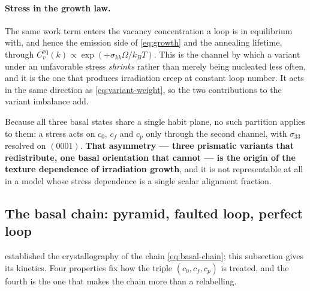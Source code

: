 \documentclass{article}
\begin{document}
\paragraph{Stress in the growth law.} The same work term enters the vacancy
concentration a loop is in equilibrium with, and hence the emission side of
\cref{eq:growth} and the annealing lifetime, through
$C_v^{\mathrm{eq}}(k)\propto\exp(+\sigma_{kk}\Omega/k_BT)$. This is the
channel by which a variant under an unfavorable stress \emph{shrinks} rather
than merely being nucleated less often, and it is the one that produces
irradiation creep at constant loop number. It acts in the same direction as
\cref{eq:variant-weight}, so the two contributions to the variant imbalance add.

Because all three basal states share a single habit plane, no such partition
applies to them: a stress acts on $c_0$, $c_f$ and $c_p$ only through the second
channel, with $\sigma_{33}$ resolved on $(0001)$. \textbf{That asymmetry --- three
prismatic variants that redistribute, one basal orientation that cannot --- is
the origin of the texture dependence of irradiation growth}, and it is not
representable at all in a model whose stress dependence is a single scalar
alignment fraction.

\subsection{The basal chain: pyramid, faulted loop, perfect loop}
\label{sec:basal}

 established the crystallography of the chain
\cref{eq:basal-chain}; this subsection gives its kinetics. Four properties fix
how the triple $(c_0,c_f,c_p)$ is treated, and the fourth is the one that makes
the chain more than a relabelling.
\end{document}
